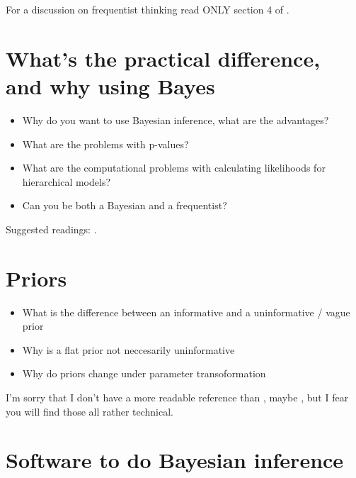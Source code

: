 \documentclass[10pt,a4paper]{article}
\begin{document}
For a discussion on frequentist thinking read ONLY section 4 of \citet{Efron-250yearargument-2013}.

\section{What's the practical difference, and why using Bayes}

\begin{mdframed}[frametitle={Ask yourself}]
\begin{itemize}
  \item Why do you want to use Bayesian inference, what are the advantages?
  \item What are the problems with p-values?
  \item What are the computational problems with calculating likelihoods for hierarchical models?
  \item Can you be both a Bayesian and a frequentist?
\end{itemize}
\end{mdframed}\vspace{0.3cm}

Suggested readings: \citep{Cohen-earthisround-1994, Kass-Statisticalinferencebig-2011}.

\section{Priors}

\begin{mdframed}[frametitle={Ask yourself}]
\begin{itemize}
  \item What is the difference between an informative and a uninformative / vague prior
  \item Why is a flat prior not neccesarily uninformative
  \item Why do priors change under parameter transoformation
\end{itemize}
\end{mdframed}\vspace{0.3cm}

I'm sorry that I don't have a more readable reference than \citet{Kass-selectionofprior-1996}, maybe \citet{Irony-Non-informativepriorsdo-1997}, but I fear you will find those all rather technical. 


\section{Software to do Bayesian inference}
\end{document}
